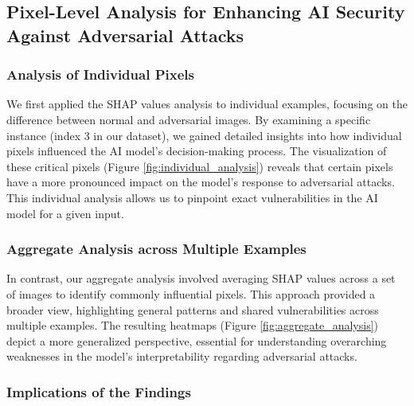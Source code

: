 \documentclass[10pt, conference, a4paper, final]{IEEEtran}
\begin{document}
  \subsection{Pixel-Level Analysis for Enhancing AI Security Against Adversarial Attacks}
  \subsubsection{Analysis of Individual Pixels}

  We first applied the SHAP values analysis to individual examples, focusing on the difference between normal 
  and adversarial images. By examining a specific instance (index 3 in our dataset), we gained detailed insights 
  into how individual pixels influenced the AI model's decision-making process. The visualization of these critical pixels (Figure \ref{fig:individual_analysis}) reveals that certain pixels have a more pronounced impact on the model's response to adversarial attacks. This individual analysis allows us to pinpoint exact vulnerabilities in the AI model for a given input.
  
  \subsubsection{Aggregate Analysis across Multiple Examples}
  
  In contrast, our aggregate analysis involved averaging SHAP values across a set of images to identify commonly influential pixels. 
  This approach provided a broader view, highlighting general patterns and shared vulnerabilities across multiple examples.
   The resulting heatmaps (Figure \ref{fig:aggregate_analysis}) depict a more generalized perspective, essential for understanding overarching weaknesses in the model's interpretability regarding adversarial attacks.
  
  \subsubsection{Implications of the Findings}
  
\end{document}
